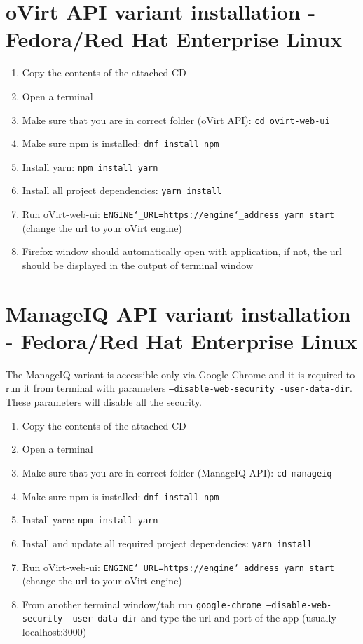 \section{oVirt API variant installation - Fedora/Red Hat Enterprise Linux}
\begin{enumerate}

\item Copy the contents of the attached CD 
\item Open a terminal
\item Make sure that you are in correct folder (oVirt API): \texttt{cd ovirt-web-ui}
\item Make sure npm is installed: \texttt{dnf install npm}
\item Install yarn: \texttt{npm install yarn}
\item Install all project dependencies: \texttt{yarn install}
\item Run oVirt-web-ui: \texttt{ENGINE\char`_URL=https://engine\char`_address yarn start} (change the url to your oVirt engine)
\item Firefox window should automatically open with application, if not, the url should be displayed in the output of terminal window
\end{enumerate} 

\newpage
\section{ManageIQ API variant installation - Fedora/Red Hat Enterprise Linux}
The ManageIQ variant is accessible only via Google Chrome and it is required to run it from terminal with parameters \texttt{--disable-web-security -user-data-dir}. These parameters will disable all the security.
\begin{enumerate}

\item Copy the contents of the attached CD 
\item Open a terminal
\item Make sure that you are in correct folder (ManageIQ API): \texttt{cd manageiq}
\item Make sure npm is installed: \texttt{dnf install npm}
\item Install yarn: \texttt{npm install yarn}
\item Install and update all required project dependencies: \texttt{yarn install}
\item Run oVirt-web-ui: \texttt{ENGINE\char`_URL=https://engine\char`_address yarn start} (change the url to your oVirt engine)
\item From another terminal window/tab run \texttt{google-chrome --disable-web-security -user-data-dir} and type the url and port of the app (usually localhost:3000)

\end{enumerate} 
